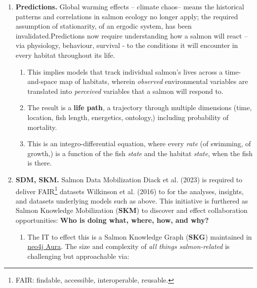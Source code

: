 \documentclass[
]{agujournal2019}
\begin{document}
\begin{enumerate}
\def\labelenumi{\arabic{enumi}.}
\item
  \textbf{Predictions.} Global warming effects -- climate chaos-- means
  the historical patterns and correlations in salmon ecology no longer
  apply; the required assumption of stationarity, of an ergodic system,
  has been invalidated.Predictions now require understanding how a
  salmon will react -- via physiology, behaviour, survival - to the
  conditions it will encounter in every habitat throughout its life.

  \begin{enumerate}
  \def\labelenumii{\Alph{enumii}.}
  \item
    This implies models that track individual salmon's lives across a
    time-and-space map of habitats, wherein \emph{observed}
    environmental variables are translated into \emph{perceived}
    variables that a salmon will respond to.
  \item
    The result is a \textbf{life path}\emph{,} a trajectory through
    multiple dimensions (time, location, fish length, energetics,
    ontology,) including probability of mortality.
  \item
    This is an integro-differential equation, where every \emph{rate}
    (of swimming, of growth,) is a function of the fish \emph{state} and
    the habitat \emph{state}, when the fish is there.
  \end{enumerate}
\item
  \textbf{SDM, SKM.} Salmon Data Mobilization Diack et al. (2023) is
  required to deliver FAIR\footnote{FAIR: findable, accessible,
    interoperable, reusable.} datasets Wilkinson et al. (2016) to for
  the analyses, insights, and datasets underlying models such as above.
  This initiative is furthered as Salmon Knowledge Mobilization
  (\textbf{SKM}) to discover and effect collaboration opportunities:
  \textbf{Who is doing what, where, how, and why?}

  \begin{enumerate}
  \def\labelenumii{\Alph{enumii}.}
  \item
    The IT to effect this is a Salmon Knowledge Graph (\textbf{SKG})
    maintained in
    \href{https://neo4j.com/cloud/platform/aura-graph-database}{neo4j
    Aura}. The size and complexity of \emph{all things salmon-related}
    is challenging but approachable via:


\end{enumerate}
\end{enumerate}
\end{document}

